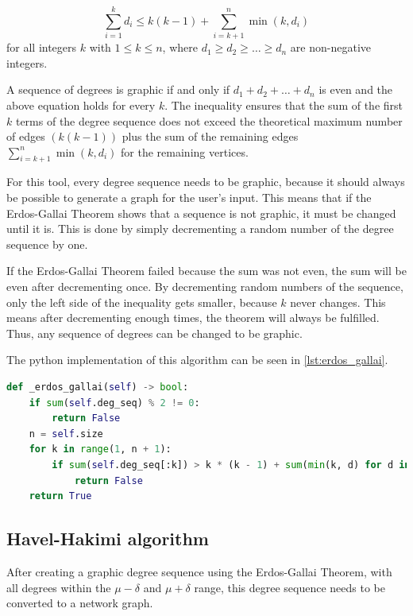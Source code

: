 \begin{equation}
\sum_{i=1}^{k} d_i \leq k(k-1) + \sum_{i=k+1}^{n} \min(k, d_i)
\end{equation}
for all integers \(k\) with \(1 \leq k \leq n\), where \(d_1 \geq d_2 \geq \ldots \geq d_n\) are non-negative integers.

A sequence of degrees is graphic if and only if \(d_1 + d_2 + \ldots + d_n\) is even and the above equation holds for every $k$. The inequality ensures that the sum of the first $k$ terms of the degree sequence does not exceed the theoretical maximum number of edges $(k(k-1))$ plus the sum of the remaining edges $\sum_{i=k+1}^{n} \min(k, d_i)$ for the remaining vertices.

For this tool, every degree sequence needs to be graphic, because it should always be possible to generate a graph for the user's input. This means that if the Erdos-Gallai Theorem shows that a sequence is not graphic, it must be changed until it is. This is done by simply decrementing a random number of the degree sequence by one.

If the Erdos-Gallai Theorem failed because the sum was not even, the sum will be even after decrementing once. By decrementing random numbers of the sequence, only the left side of the inequality gets smaller, because $k$ never changes. This means after decrementing enough times, the theorem will always be fulfilled. Thus, any sequence of degrees can be changed to be graphic.

The python implementation of this algorithm can be seen in \ref{lst:erdos_gallai}.

\begin{lstlisting}[language=python, caption={Erdos-Gallai Theorem in Python}, label={lst:erdos_gallai}]
def _erdos_gallai(self) -> bool:
    if sum(self.deg_seq) % 2 != 0:
        return False
    n = self.size
    for k in range(1, n + 1):
        if sum(self.deg_seq[:k]) > k * (k - 1) + sum(min(k, d) for d in self.deg_seq[k + 1 :]):
            return False
    return True
\end{lstlisting}

\subsection{Havel-Hakimi algorithm}
\label{sub:havel_hakimi}
After creating a graphic degree sequence using the Erdos-Gallai Theorem, with all degrees within the $\mu - \delta$ and $\mu + \delta$ range, this degree sequence needs to be converted to a network graph.

